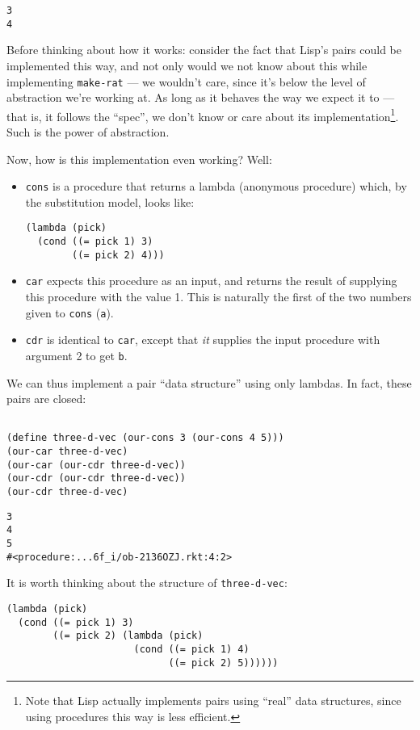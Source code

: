 \documentclass[9pt]{report}
\begin{document}
\begin{verbatim}
3
4
\end{verbatim}


Before thinking about how it works: consider the fact that Lisp's
pairs could be implemented this way, and not only would we not know
about this while implementing \texttt{make-rat} --- we wouldn't care,
since it's below the level of abstraction we're working at. As long
as it behaves the way we expect it to --- that is, it follows the
``spec'', we don't know or care about its implementation\footnote{Note that Lisp actually implements pairs using ``real'' data
structures, since using procedures this way is less efficient.}. Such is the
power of abstraction.

Now, how is this implementation even working? Well:
\begin{itemize}
\item \texttt{cons} is a procedure that returns a lambda (anonymous procedure)
which, by the substitution model, looks like:
\begin{verbatim}
(lambda (pick)
  (cond ((= pick 1) 3)
        ((= pick 2) 4)))
\end{verbatim}
\item \texttt{car} expects this procedure as an input, and returns the result of
supplying this procedure with the value 1. This is naturally the
first of the two numbers given to \texttt{cons} (\texttt{a}).
\item \texttt{cdr} is identical to \texttt{car}, except that \emph{it} supplies the input
procedure with argument 2 to get \texttt{b}.
\end{itemize}

We can thus implement a pair ``data structure'' using only lambdas.
In fact, these pairs are closed:

\begin{verbatim}

(define three-d-vec (our-cons 3 (our-cons 4 5)))
(our-car three-d-vec)
(our-car (our-cdr three-d-vec))
(our-cdr (our-cdr three-d-vec))
(our-cdr three-d-vec)
\end{verbatim}

\begin{verbatim}
3
4
5
#<procedure:...6f_i/ob-2136OZJ.rkt:4:2>
\end{verbatim}


It is worth thinking about the structure of \texttt{three-d-vec}:
\begin{verbatim}
(lambda (pick)
  (cond ((= pick 1) 3)
        ((= pick 2) (lambda (pick)
                      (cond ((= pick 1) 4)
                            ((= pick 2) 5))))))
\end{verbatim}
\end{document}
